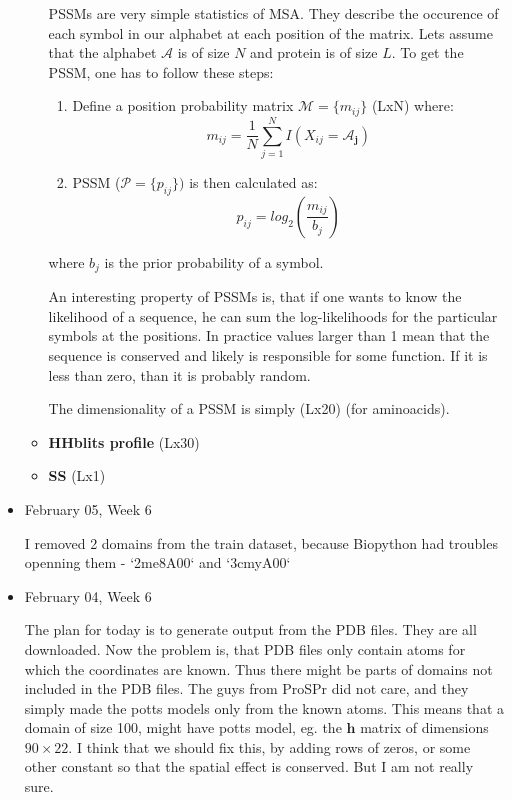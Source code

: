 \documentclass[11pt]{article}
\begin{document}
\begin{itemize}
\begin{itemize}
            PSSMs are very simple statistics of MSA. They describe the occurence of each symbol in our alphabet at each position of the matrix. Lets assume that the alphabet $\bm{\mathcal{A}}$ is of size $N$ and protein is of size $L$. To get the PSSM, one has to follow these steps:
            \begin{enumerate}
                \item Define a position probability matrix $\bm{\mathcal{M}} = \{m_{ij}\}$ (LxN) where:
                $$m_{ij} = \frac{1}{N} \sum_{j = 1}^{N} I(X_{ij} = \bm{\mathcal{A}_j})$$
            
                \item PSSM ($\bm{\mathcal{P}} = \{p_{ij}\})$ is then calculated as:
                $$p_{ij} = log_2\left(\frac{m_{ij}}{b_j}\right)$$
            \end{enumerate}    
                where $b_j$ is the prior probability of a symbol.
                
                An interesting property of PSSMs is, that if one wants to know the likelihood of a sequence, he can sum the log-likelihoods for the particular symbols at the positions. In practice values larger than 1 mean that the sequence is conserved and likely is responsible for some function. If it is less than zero, than it is probably random.
                
                The dimensionality of a PSSM is simply (Lx20) (for aminoacids).
        \item \textbf{HHblits profile} (Lx30)
        
        
        \item \textbf{SS} (Lx1) 
    \end{itemize}
    
    \item February 05, Week 6
    
    I removed 2 domains from the train dataset, because Biopython had troubles openning them - `2me8A00` and `3cmyA00`

    \item February 04, Week 6
    
    The plan for today is to generate output from the PDB files. They are all downloaded. Now the problem is, that PDB files only contain atoms for which the coordinates are known. Thus there might be parts of domains not included in the PDB files. The guys from ProSPr did not care, and they simply made the potts models only from the known atoms. This means that a domain of size 100, might have potts model, eg. the $\bm{h}$ matrix of dimensions $90 \times 22$. I think that we should fix this, by adding rows of zeros, or some other constant so that the spatial effect is conserved. But I am not really sure.
    

\end{itemize}
\end{document}
